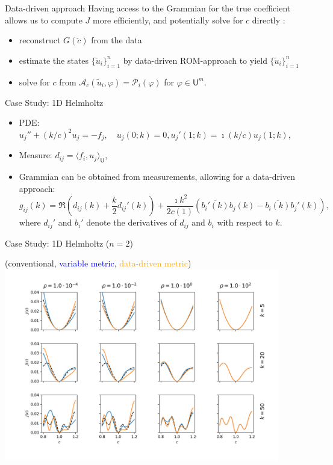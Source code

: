 \documentclass{beamer}
\newcommand{\sU}{\mathsf{U}}
\newcommand{\mA}{\mathcal{A}}
\newcommand{\mP}{\mathcal{P}}
\begin{document}
\begin{frame}{Data-driven approach}
Having access to the Grammian for the true coefficient allows us to compute $J$ more efficiently, and potentially solve for $c$ directly \cite{borcea2022waveform}:
\begin{itemize}
  \item reconstruct $G(\check{c})$ from the data
  \item estimate the states $\{\check{u}_i\}_{i=1}^n$ by data-driven ROM-approach to yield $\{\widetilde{u}_i\}_{i=1}^n$ 
  \item solve for $c$ from $\mA_c(\widetilde{u}_i,\varphi)=\mP_i(\varphi)$ for $\varphi\in \sU^m$.
\end{itemize}
\end{frame}


\begin{frame}{Case Study: 1D Helmholtz}
\begin{itemize}
  \item PDE: $u_j'' + (k/c)^2 u_j = -f_j, \quad u_j(0;k) = 0, u_j'(1;k)=\imath (k/c)u_j(1;k)$,
  \item Measure: $d_{ij} = \langle f_i, u_j\rangle_\sU$,
  \item Grammian can be obtained from measurements, allowing for a data-driven approach: $$ g_{ij}(k) = \Re\left(d_{ij}(k) + {\textstyle\frac{k}{2}}d_{ij}'(k)\right) + {\textstyle\frac{\imath k^2}{2c(1)}}\left(\overline{b_i'(k)}b_j(k) - \overline{b_i(k)}b_j'(k)\right),
$$
where $d_{ij}'$ and $b_i'$ denote the derivatives of $d_{ij}$ and $b_i$ with respect to $k$. 
\end{itemize}
\end{frame}

\begin{frame}{Case Study: 1D Helmholtz ($n=2$)}
  \begin{center}
(conventional, \textcolor{blue}{variable metric}, \textcolor{orange}{data-driven metric})
\includegraphics[width=0.9\textwidth]{../paper/figures/Helmholtz1D_2.png}
  \end{center}
\end{frame}
\end{document}
